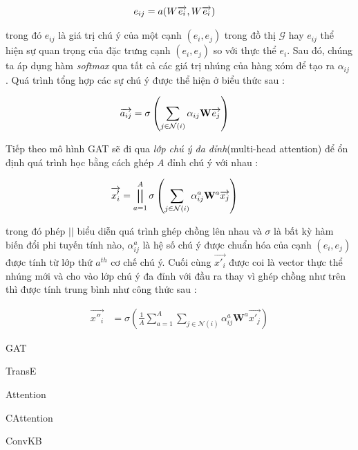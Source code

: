 \begin{align}
\centering
{e_{ij}}&={a(W \overrightarrow{e_i}, W \overrightarrow{e_i})}
\end{align}

trong đó $e_{ij}$ là giá trị chú ý của một cạnh $(e_i, e_j)$ trong đồ thị $\mathcal{G}$ hay $e_{ij}$ thể hiện sự quan trọng của đặc trưng cạnh $(e_i, e_j)$ so với thực thể $e_i$. Sau đó, chúng ta áp dụng hàm \textit{softmax} qua tất cả các giá trị nhúng của hàng xóm để tạo ra $\alpha_{ij}$ . Quá trình tổng hợp các sự chú ý được thể hiện ở biểu thức sau : 

\begin{align}
\centering
{\overrightarrow{a_{ij}}}&={\sigma\left(\sum_{j\in \mathcal{N}(i)} {\alpha_{ij} \mathbf{W} \overrightarrow{e_j} }\right)}
\end{align}

Tiếp theo mô hình GAT sẽ đi qua \textit{lớp chú ý đa đỉnh}(multi-head attention) để ổn định quá trình học bằng cách ghép $A$ đỉnh chú ý với nhau :

\begin{align}
{\overrightarrow{x'_i}}&={\bigparallel_{a=1}^{A}\sigma\left(\sum_{j\in \mathcal{N}(i)}\alpha_{ij}^{a} \mathbf{W}^{a} \overrightarrow{x_{j}} \right)}
\end{align}

trong đó phép $||$ biểu diễn quá trình ghép chồng lên nhau và $\sigma$ là bất kỳ hàm biến đổi phi tuyến tính nào, $\alpha_{ij}^a$ là hệ số chú ý được chuẩn hóa của cạnh $(e_i, e_j)$ được tính từ lớp thứ $a^{th}$ cơ chế chú ý. Cuối cùng $\overrightarrow{x'_i}$ được coi là vector thực thể nhúng mới và cho vào lớp chú ý đa đỉnh với đầu ra thay vì ghép chồng như trên thì được tính trung bình như công thức sau :

\begin{align}
{\overrightarrow{x''_i}}&={\sigma\left(\frac{1}{A} \sum_{a=1}^{A}\sum_{j\in \mathcal{N}(i)}\alpha_{ij}^{a} \mathbf{W}^{a} \overrightarrow{x'_{j}} \right)}
\end{align}


 \cite{nathani2019learning}

GAT \cite{velivckovic2017graph}

TransE \cite{bordes2013translating}

Attention \cite{vaswani2017attention}

CAttention \cite{cordonnier2020multi}

ConvKB \cite{nguyen2017novel}

